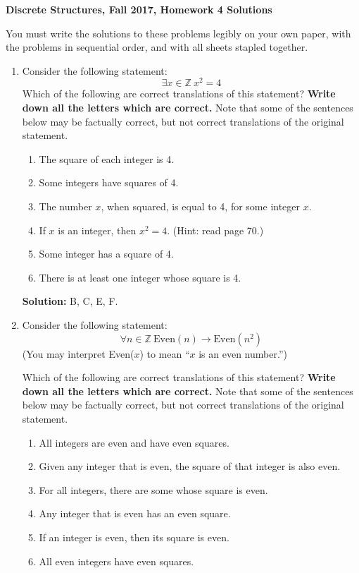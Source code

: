 \documentclass[12pt, letterpaper]{report}
\newcommand{\Z}{\mathbb{Z}}
\newcommand{\sol}{\textbf{Solution: }}
\begin{document}
{\textbf{Discrete Structures, Fall 2017, Homework 4 Solutions}}

\medbreak

You must write the solutions to these problems legibly on your own paper, with
the problems in sequential order, and with all sheets stapled together.

\begin{enumerate}

\item Consider the following statement:
$$\exists x \in \Z \ x^2=4$$
Which of the following are correct translations of this statement?  \textbf{Write down all the letters which are correct.}
Note that some of the sentences below may be factually correct, but not correct translations of the original statement.
\begin{enumerate}
        \item The square of each integer is 4.
        \item Some integers have squares of 4.
        \item The number $x$, when squared, is equal to 4, for some integer $x$.
        \item If $x$ is an integer, then $x^2=4$.  (Hint: read page 70.)
        \item Some integer has a square of 4.
        \item There is at least one integer whose square is 4.
\end{enumerate}

\sol B, C, E, F.


\item Consider the following statement:
$$\forall n \in \Z \ \text{Even}(n) \to \text{Even}(n^2)$$
(You may interpret Even($x$) to mean ``$x$ is an even number.'')

Which of the following are correct translations of this statement?  \textbf{Write down all the letters which are correct.}
Note that some of the sentences below may be factually correct, but not correct translations of the original statement.
\begin{enumerate}
        \item All integers are even and have even squares.
        \item Given any integer that is even, the square of that integer is also even.
        \item For all integers, there are some whose square is even.
        \item Any integer that is even has an even square.
        \item If an integer is even, then its square is even.
        \item All even integers have even squares.
\end{enumerate}


\end{enumerate}
\end{document}

